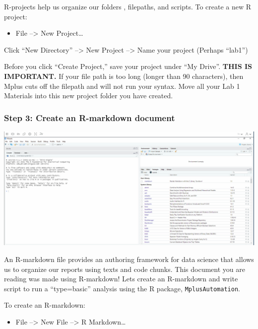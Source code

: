 \documentclass[
]{article}
\providecommand{\tightlist}{%
  \setlength{\itemsep}{0pt}\setlength{\parskip}{0pt}}
\begin{document}
R-projects help us organize our folders , filepaths, and scripts. To
create a new R project:

\begin{itemize}
\tightlist
\item
  File --\textgreater{} New Project\ldots{}
\end{itemize}

Click ``New Directory'' --\textgreater{} New Project --\textgreater{}
Name your project (Perhaps ``lab1'')

Before you click ``Create Project,'' save your project under ``My
Drive''. \textbf{THIS IS IMPORTANT.} If your file path is too long
(longer than 90 characters), then Mplus cuts off the filepath and will
not run your syntax. Move all your Lab 1 Materials into this new project
folder you have created.

\hypertarget{step-3-create-an-r-markdown-document}{%
\subsubsection{Step 3: Create an R-markdown
document}\label{step-3-create-an-r-markdown-document}}

\includegraphics{rmarkdown.gif}

An R-markdown file provides an authoring framework for data science that
allows us to organize our reports using texts and code chunks. This
document you are reading was made using R-markdown! Lets create an
R-markdown and write script to run a ``type=basic'' analysis using the R
package, \texttt{MplusAutomation}.

To create an R-markdown:

\begin{itemize}
\tightlist
\item
  File --\textgreater{} New File --\textgreater{} R Markdown\ldots{}
\end{itemize}
\end{document}

